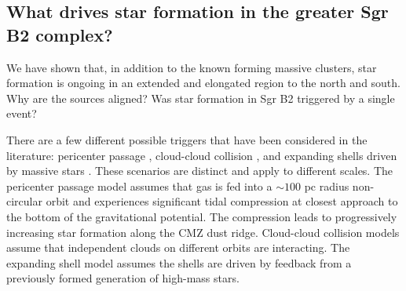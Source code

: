\documentclass[twocolumn]{aastex61}
\begin{document}
% 






\subsection{What drives star formation in the greater Sgr B2 complex?}
\label{sec:whatdrives}
We have shown that, in addition to the known forming massive clusters,
star formation is ongoing in an extended and elongated region to the north
and south.  Why are the sources aligned?  Was star formation in Sgr B2
triggered by a single event?

There are a few different possible triggers that have been considered in the
literature: pericenter passage
\citep[\S\ref{sec:pericenter};][]{Longmore2013a,Kruijssen2015a},
cloud-cloud collision
\citep[\S\ref{sec:ccc};][]{Hasegawa1994a,Mehringer1997a,Sato2000a}, and
expanding shells driven by
massive stars \citep[\S \ref{sec:expandingshells};][]{Martin-Pintado1999a}.
These scenarios are distinct and
apply to different scales.  The pericenter passage model assumes that gas is
fed into a $\sim100$ pc radius non-circular orbit and experiences significant
tidal compression at closest approach to the bottom of the gravitational
potential.  The compression leads to progressively increasing star formation
along the CMZ dust ridge.  Cloud-cloud collision models assume that independent
clouds on different orbits are interacting.  The expanding shell model assumes
the shells are driven by feedback from a previously formed generation of
high-mass stars.
\end{document}
